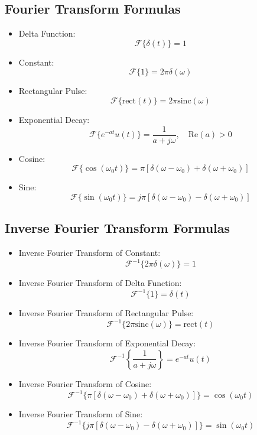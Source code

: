 \documentclass[12pt]{article}
\begin{document}
\subsection{Fourier Transform Formulas}
\begin{itemize}
    \item Delta Function:
    \[
    \mathcal{F}\{\delta(t)\} = 1
    \]
    \item Constant:
    \[
    \mathcal{F}\{1\} = 2\pi \delta(\omega)
    \]
    \item Rectangular Pulse:
    \[
    \mathcal{F}\{\text{rect}(t)\} = 2\pi \text{sinc}(\omega)
    \]
    \item Exponential Decay:
    \[
    \mathcal{F}\{e^{-at}u(t)\} = \frac{1}{a + j\omega}, \quad \text{Re}(a) > 0
    \]
    \item Cosine:
    \[
    \mathcal{F}\{\cos(\omega_0 t)\} = \pi [\delta(\omega - \omega_0) + \delta(\omega + \omega_0)]
    \]
    \item Sine:
    \[
    \mathcal{F}\{\sin(\omega_0 t)\} = j\pi [\delta(\omega - \omega_0) - \delta(\omega + \omega_0)]
    \]
\end{itemize}

\subsection{Inverse Fourier Transform Formulas}
\begin{itemize}
    \item Inverse Fourier Transform of Constant:
    \[
    \mathcal{F}^{-1}\{2\pi \delta(\omega)\} = 1
    \]
    \item Inverse Fourier Transform of Delta Function:
    \[
    \mathcal{F}^{-1}\{1\} = \delta(t)
    \]
    \item Inverse Fourier Transform of Rectangular Pulse:
    \[
    \mathcal{F}^{-1}\{2\pi \text{sinc}(\omega)\} = \text{rect}(t)
    \]
    \item Inverse Fourier Transform of Exponential Decay:
    \[
    \mathcal{F}^{-1}\left\{\frac{1}{a + j\omega}\right\} = e^{-at}u(t)
    \]
    \item Inverse Fourier Transform of Cosine:
    \[
    \mathcal{F}^{-1}\{\pi [\delta(\omega - \omega_0) + \delta(\omega + \omega_0)]\} = \cos(\omega_0 t)
    \]
    \item Inverse Fourier Transform of Sine:
    \[
    \mathcal{F}^{-1}\{j\pi [\delta(\omega - \omega_0) - \delta(\omega + \omega_0)]\} = \sin(\omega_0 t)
    \]
\end{itemize}
\end{document}
